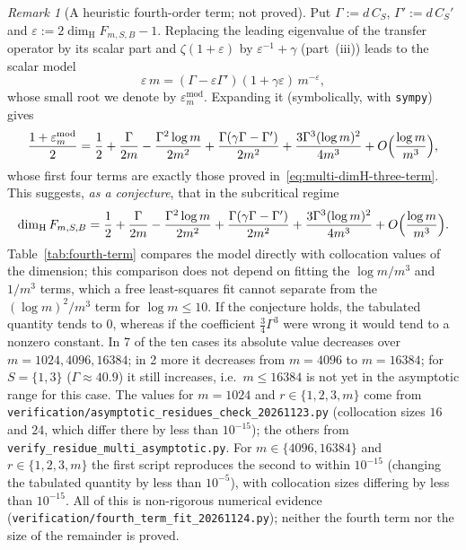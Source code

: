\documentclass[11pt]{article}
\theoremstyle{definition}
\theoremstyle{remark}
\newtheorem{remark}[theorem]{Remark}
\newcommand{\dimH}{\dim_{\mathrm{H}}}
\begin{document}
\begin{remark}[A heuristic fourth-order term; not proved]\label{rem:fourth-term}
Put $\Gamma:=d\,C_S$, $\Gamma':=d\,C_S'$ and $\varepsilon:=2\dimH F_{m,S,B}-1$. Replacing the
leading eigenvalue of the transfer operator by its scalar part and $\zeta(1+\varepsilon)$ by
$\varepsilon^{-1}+\gamma$ (part~(iii)) leads to the scalar model
\[
\varepsilon\,m=(\Gamma-\varepsilon\Gamma')(1+\gamma\varepsilon)\,m^{-\varepsilon},
\]
whose small root we denote by $\varepsilon_m^{\mathrm{mod}}$. Expanding it (symbolically, with
\texttt{sympy}) gives
\[
\frac{1+\varepsilon_m^{\mathrm{mod}}}{2}=\frac12+\frac{\Gamma}{2m}-\frac{\Gamma^2\log m}{2m^2}
+\frac{\Gamma(\gamma\Gamma-\Gamma')}{2m^2}+\frac{3\Gamma^3(\log m)^2}{4m^3}
+O\Bigl(\frac{\log m}{m^3}\Bigr),
\]
whose first four terms are exactly those proved in~\eqref{eq:multi-dimH-three-term}. This
suggests, \emph{as a conjecture}, that in the subcritical regime
\[
\dimH F_{m,S,B}=\frac12+\frac{\Gamma}{2m}-\frac{\Gamma^2\log m}{2m^2}
+\frac{\Gamma(\gamma\Gamma-\Gamma')}{2m^2}+\frac{3\Gamma^3(\log m)^2}{4m^3}
+O\Bigl(\frac{\log m}{m^3}\Bigr).
\]
Table~\ref{tab:fourth-term} compares the model directly with collocation values of the
dimension; this comparison does not depend on fitting the $\log m/m^3$ and $1/m^3$ terms, which a
free least-squares fit cannot separate from the $(\log m)^2/m^3$ term for $\log m\le 10$. If the
conjecture holds, the tabulated quantity tends to $0$, whereas if the coefficient
$\frac34\Gamma^3$ were wrong it would tend to a nonzero constant. In 7 of the ten
cases its absolute value decreases over $m=1024,4096,16384$; in 2 more it
decreases from $m=4096$ to $m=16384$; for $S=\{1,3\}$ ($\Gamma\approx40.9$) it still increases,
i.e.\ $m\le16384$ is not yet in the asymptotic range for this case. The values for $m=1024$
and $r\in\{1,2,3,m\}$ come from \texttt{verification/\allowbreak asymptotic\_\allowbreak residues\_\allowbreak check\_\allowbreak 20261123.py}
(collocation sizes $16$ and $24$, which differ there by less than $10^{-15}$); the others from
\texttt{verify\_\allowbreak residue\_\allowbreak multi\_\allowbreak asymptotic.py}. For $m\in\{4096,16384\}$ and
$r\in\{1,2,3,m\}$ the first script reproduces the second to within $10^{-15}$
(changing the tabulated quantity by less than $10^{-5}$), with
collocation sizes differing by less than $10^{-15}$. All of this is non-rigorous numerical
evidence (\texttt{verification/\allowbreak fourth\_\allowbreak term\_\allowbreak fit\_\allowbreak 20261124.py}); neither the
fourth term nor the size of the remainder is proved.
\end{remark}
\end{document}
